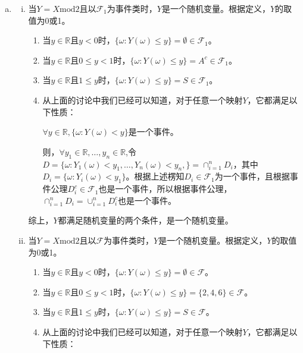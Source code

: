 \documentclass[UTF8]{article}
\begin{document}
\begin{enumerate}[a)]
\begin{enumerate}[i.]
            \end{enumerate}
        \item \begin{enumerate}[i.]
                    \item 当$Y=X\text{mod}2$且以$\mathcal{F}_1$为事件类时，$Y$是一个随机变量。根据定义，$Y$的取值为0或1。
                        \begin{enumerate}[(1)]
                            \item 当$y\in\mathbb{R}\text{且}y<0$时，$\{\omega:Y(\omega)\leq y\}=\emptyset\in\mathcal{F}_1$。
                            \item 当$y\in\mathbb{R}\text{且}0\leq y<1$时，$\{\omega:Y(\omega)\leq y\}=A^c\in\mathcal{F}_1$。
                            \item 当$y\in\mathbb{R}\text{且}1\leq y$时，$\{\omega:Y(\omega)\leq y\}=S\in\mathcal{F}_1$。
                            \item 从上面的讨论中我们已经可以知道，对于任意一个映射$Y$，它都满足以下性质：
                            
                            $\forall y\in\mathbb{R}, \{\omega:Y(\omega)<y\}$是一个事件。 
                            
                           则，$\forall y_1\in\mathbb{R},\dots,y_n\in\mathbb{R}$,令$D=\{\omega:Y_1(\omega)<y_1,\dots,Y_n(\omega)<y_n,\}=\cap^n_{i=1}D_i$，其中$D_i=\{\omega:Y_i(\omega)<y_1\}$。根据上述楞知$D_i\in\mathcal{F}_1$为一个事件，且根据事件公理$D_i^c\in\mathcal{F}_1$也是一个事件，所以根据事件公理，$\cap^n_{i=1}D_i=\cup^n_{i=1}D_i^c$也是一个事件。
                        \end{enumerate}
                        综上，$Y$都满足随机变量的两个条件，是一个随机变量。
                    \item 当$Y=X\text{mod}2$且以$\mathcal{F}$为事件类时，$Y$是一个随机变量。根据定义，$Y$的取值为0或1。
                    \begin{enumerate}[(1)]
                        \item 当$y\in\mathbb{R}\text{且}y<0$时，$\{\omega:Y(\omega)\leq y\}=\emptyset\in\mathcal{F}$。
                        \item 当$y\in\mathbb{R}\text{且}0\leq y<1$时，$\{\omega:Y(\omega)\leq y\}=\{2, 4, 6\}\in\mathcal{F}$。
                        \item 当$y\in\mathbb{R}\text{且}1\leq y$时，$\{\omega:Y(\omega)\leq y\}=S\in\mathcal{F}$。
                        \item 从上面的讨论中我们已经可以知道，对于任意一个映射$Y$，它都满足以下性质：
                        

\end{enumerate}
\end{enumerate}
\end{enumerate}
\end{document}
